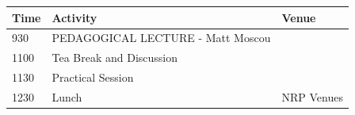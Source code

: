 \documentclass[12pt,]{book}
\begin{document}
\begin{longtable}[]{@{}lll@{}}
\toprule
\begin{minipage}[b]{0.09\columnwidth}\raggedright\strut
Time\strut
\end{minipage} & \begin{minipage}[b]{0.38\columnwidth}\raggedright\strut
Activity\strut
\end{minipage} & \begin{minipage}[b]{0.13\columnwidth}\raggedright\strut
Venue\strut
\end{minipage}\tabularnewline
\midrule
\endhead
\begin{minipage}[t]{0.09\columnwidth}\raggedright\strut
930\strut
\end{minipage} & \begin{minipage}[t]{0.38\columnwidth}\raggedright\strut
PEDAGOGICAL LECTURE - Matt Moscou\strut
\end{minipage} & \begin{minipage}[t]{0.13\columnwidth}\raggedright\strut
\strut
\end{minipage}\tabularnewline
\begin{minipage}[t]{0.09\columnwidth}\raggedright\strut
1100\strut
\end{minipage} & \begin{minipage}[t]{0.38\columnwidth}\raggedright\strut
Tea Break and Discussion\strut
\end{minipage} & \begin{minipage}[t]{0.13\columnwidth}\raggedright\strut
\strut
\end{minipage}\tabularnewline
\begin{minipage}[t]{0.09\columnwidth}\raggedright\strut
1130\strut
\end{minipage} & \begin{minipage}[t]{0.38\columnwidth}\raggedright\strut
Practical Session\strut
\end{minipage} & \begin{minipage}[t]{0.13\columnwidth}\raggedright\strut
\strut
\end{minipage}\tabularnewline
\begin{minipage}[t]{0.09\columnwidth}\raggedright\strut
1230\strut
\end{minipage} & \begin{minipage}[t]{0.38\columnwidth}\raggedright\strut
Lunch\strut
\end{minipage} & \begin{minipage}[t]{0.13\columnwidth}\raggedright\strut
NRP Venues\strut

\end{minipage}
\end{longtable}
\end{document}
